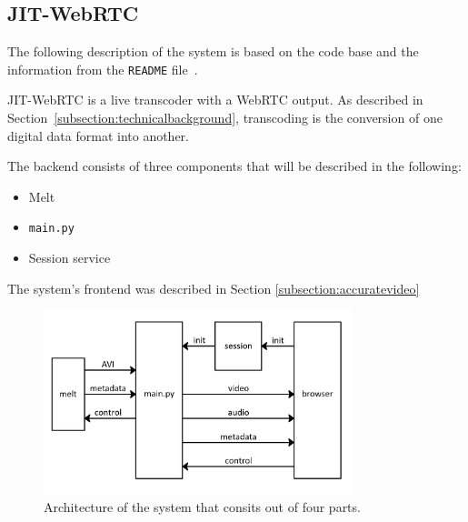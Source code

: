 \documentclass[12pt,a4paper]{article}
\begin{document}
\subsection{JIT-WebRTC} \label{subsection:jit-webrtc}

The following description of the system is based on the code base and the information from the \texttt{README} file~\cite{RM_Backend}.

JIT-WebRTC is a live transcoder with a WebRTC output. As described in Section~\ref{subsection:technicalbackground}, transcoding is the conversion of one digital data format into another.~\cite{transcoding}

%
%

The backend consists of three components that will be described in the following:
\begin{itemize}
	\item Melt
	\item \texttt{main.py}
	\item Session service
\end{itemize}

The system's frontend was described in Section \ref{subsection:accuratevideo}

\begin{figure}[H]
	\centering
	\includegraphics[width=0.8\textwidth]{IM3.png}
	\caption[System architecture]{Architecture of the system that consits out of four parts.}
\end{figure}
\end{document}
